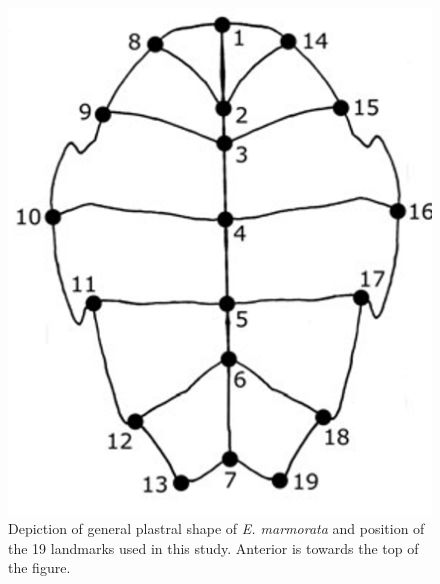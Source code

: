 \documentclass[fleqn,10pt,lineno]{wlpeerj} %
\begin{document}
\afterpage{\clearpage}
\begin{figure}[ht]
  \centering
  \includegraphics[height = 0.5\textheight, width = \textwidth, keepaspectratio = true]{figure/plastra}
  \caption{Depiction of general plastral shape of \textit{E. marmorata} and position of the 19 landmarks used in this study. Anterior is towards the top of the figure.}
  \label{fig:plastra}
\end{figure}
\end{document}
